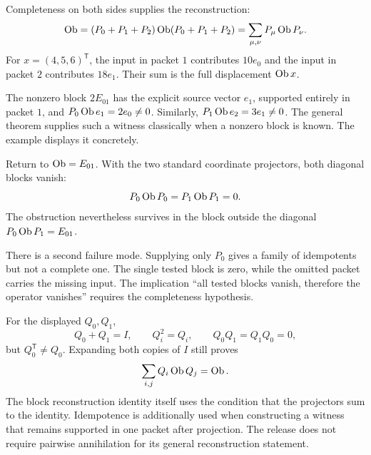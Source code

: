
Completeness on both sides supplies the reconstruction:
\[
\operatorname{Ob}=(P_0+P_1+P_2)\operatorname{Ob}(P_0+P_1+P_2)
=\sum_{\mu,\nu}P_\mu\operatorname{Ob} P_\nu.
\]
For $x=(4,5,6)^\mathsf T$, the input in packet $1$ contributes $10e_0$ and the input in packet $2$ contributes $18e_1$. Their sum is the full displacement $\operatorname{Ob} x$.

The nonzero block $2E_{01}$ has the explicit source vector $e_1$, supported entirely in packet $1$, and $P_0\operatorname{Ob} e_1=2e_0\ne0$. Similarly, $P_1\operatorname{Ob} e_2=3e_1\ne0$. The general theorem supplies such a witness classically when a nonzero block is known. The example displays it concretely.


Return to $\operatorname{Ob}=E_{01}$. With the two standard coordinate projectors, both diagonal blocks vanish:
\[
P_0\operatorname{Ob} P_0=P_1\operatorname{Ob} P_1=0.
\]
The obstruction nevertheless survives in the block outside the diagonal $P_0\operatorname{Ob} P_1=E_{01}$.


There is a second failure mode. Supplying only $P_0$ gives a family of idempotents but not a complete one. The single tested block is zero, while the omitted packet carries the missing input. The implication ``all tested blocks vanish, therefore the operator vanishes'' requires the completeness hypothesis.

For the displayed $Q_0,Q_1$,
\[
Q_0+Q_1=I,\qquad Q_i^2=Q_i,\qquad Q_0Q_1=Q_1Q_0=0,
\]
but $Q_0^\mathsf T\ne Q_0$. Expanding both copies of $I$ still proves
\[
\sum_{i,j}Q_i\operatorname{Ob} Q_j=\operatorname{Ob}.
\]
The block reconstruction identity itself uses the condition that the projectors sum to the identity. Idempotence is additionally used when constructing a witness that remains supported in one packet after projection. The release does not require pairwise annihilation for its general reconstruction statement.

